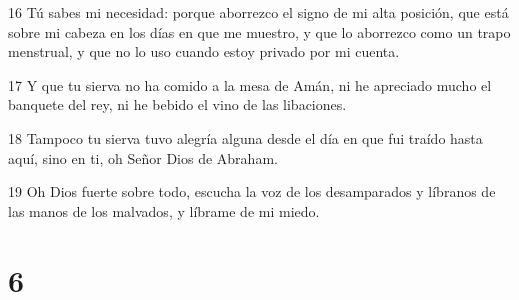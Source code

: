\par 16 Tú sabes mi necesidad: porque aborrezco el signo de mi alta posición, que está sobre mi cabeza en los días en que me muestro, y que lo aborrezco como un trapo menstrual, y que no lo uso cuando estoy privado por mi cuenta.
\par 17 Y que tu sierva no ha comido a la mesa de Amán, ni he apreciado mucho el banquete del rey, ni he bebido el vino de las libaciones.
\par 18 Tampoco tu sierva tuvo alegría alguna desde el día en que fui traído hasta aquí, sino en ti, oh Señor Dios de Abraham.
\par 19 Oh Dios fuerte sobre todo, escucha la voz de los desamparados y líbranos de las manos de los malvados, y líbrame de mi miedo.

\chapter{6}


